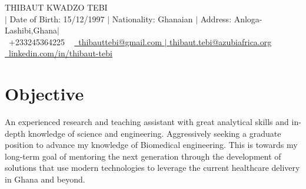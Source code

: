 \documentclass[letterpaper,11pt]{article}
\newcommand{\resumeItem}[1]{
  \item\small{
    {#1 \vspace{-2pt}}
  }
}
\begin{document}

\begin{center}
    {\Huge \scshape THIBAUT KWADZO TEBI} \\ \vspace{1pt}
   $|$ Date of Birth: 15/12/1997 $|$  Nationality: Ghanaian $|$ Address: Anloga-Lashibi,Ghana$|$ \\ \vspace{1pt}
    \small \raisebox{-0.1\height}\faPhone\ +233245364225 ~ \href{mailto:x@gmail.com}{\raisebox{-0.2\height}\faEnvelope\  \underline{thibauttebi@gmail.com $|$ thibaut.tebi@azubiafrica.org}} ~ 
    \href{https://linkedin.com/in//}{\raisebox{-0.2\height}\faLinkedin\ \underline{linkedin.com/in/thibaut-tebi}}  ~
    \vspace{-8pt}
\end{center}
\section{Objective }
    \resumeItem{An experienced research and teaching assistant with great analytical skills and in-depth knowledge of science and engineering. Aggressively seeking a graduate position to advance my knowledge of Biomedical engineering. This is towards my long-term goal of mentoring the next generation through the development of solutions that use modern technologies to leverage the current healthcare delivery in Ghana and beyond.}
    
  
\end{document}
